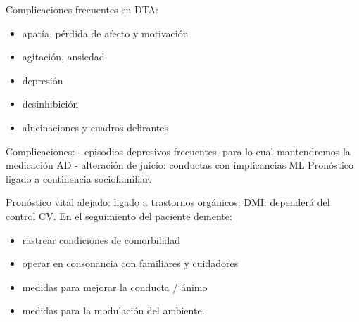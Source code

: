 Complicaciones frecuentes en DTA:

\begin{itemize}
	\item apatía, pérdida de afecto y motivación
	\item agitación, ansiedad
	\item depresión
	\item desinhibición
	\item alucinaciones y cuadros delirantes 
\end{itemize}

Complicaciones: 
- episodios depresivos frecuentes, para lo cual mantendremos la medicación AD 
- alteración de juicio: conductas con implicancias ML Pronóstico ligado a continencia sociofamiliar. 

Pronóstico vital alejado: ligado a trastornos orgánicos. DMI: dependerá del control CV. En el seguimiento del paciente demente:
 
\begin{itemize}
	\item rastrear condiciones de comorbilidad 
	\item operar en consonancia con familiares y cuidadores 
	\item medidas para mejorar la conducta / ánimo 
	\item medidas para la modulación del ambiente.
\end{itemize}
\printbibliography[]
